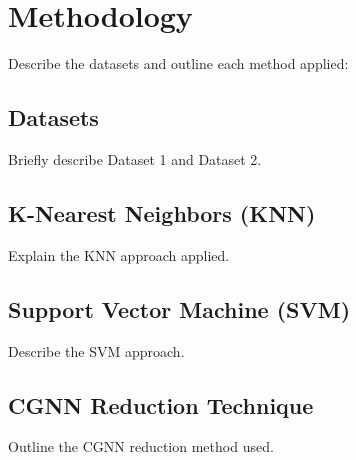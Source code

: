 \section{Methodology}
Describe the datasets and outline each method applied:
\subsection{Datasets}
Briefly describe Dataset 1 and Dataset 2.

\subsection{K-Nearest Neighbors (KNN)}
Explain the KNN approach applied.

\subsection{Support Vector Machine (SVM)}
Describe the SVM approach.

\subsection{CGNN Reduction Technique}
Outline the CGNN reduction method used.
